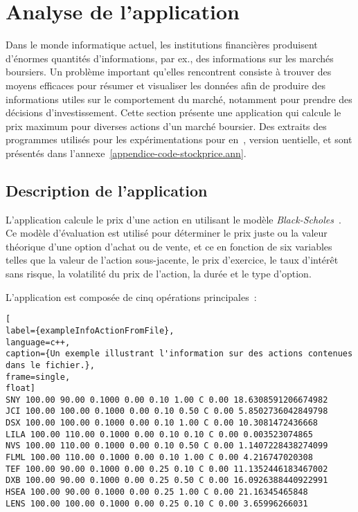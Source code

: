 \section{Analyse de l'application }
\label{stockprice.sect}

Dans le monde informatique actuel, les institutions financi\`eres produisent d'\'enormes quantit\'es d'informations, par ex., des informations sur les march\'es boursiers. Un probl\`eme important qu'elles rencontrent consiste \`a trouver des moyens efficaces pour r\'esumer et visualiser les donn\'ees afin de produire des informations utiles sur le comportement du march\'e, notamment pour prendre des d\'ecisions d'investissement. Cette section pr\'esente une application qui calcule le prix maximum pour diverses actions d'un marché boursier. Des extraits des programmes utilis\'es pour les exp\'erimentations pour  en~,  version uentielle,  et  sont pr\'esent\'es dans l'annexe~\ref{appendice-code-stockprice.ann}.


\subsection{Description de l'application}

L'application  calcule le prix d'une action en utilisant le modèle \emph{Black-Scholes}~\citep{macbeth1979empirical}. Ce mod\`ele d'\'evaluation est utilis\'e pour d\'eterminer le prix juste ou la valeur th\'eorique d'une option d'achat ou de vente, et ce en fonction de six variables telles que la valeur de l'action sous-jacente, le prix d'exercice, le taux d'int\'er\^et sans risque, la volatilit\'e du prix de l'action, la dur\'ee et le type d'option. 

L'application  est compos\'ee de cinq op\'erations principales~: 

\begin{lstlisting}[
label={exampleInfoActionFromFile},
language=c++,
caption={Un exemple illustrant l'information sur des actions contenues dans le fichier.},
frame=single,
float]
SNY 100.00 90.00 0.1000 0.00 0.10 1.00 C 0.00 18.6308591206674982
JCI 100.00 100.00 0.1000 0.00 0.10 0.50 C 0.00 5.8502736042849798
DSX 100.00 100.00 0.1000 0.00 0.10 1.00 C 0.00 10.3081472436668
LILA 100.00 110.00 0.1000 0.00 0.10 0.10 C 0.00 0.003523074865
NVS 100.00 110.00 0.1000 0.00 0.10 0.50 C 0.00 1.1407228438274099
FLML 100.00 110.00 0.1000 0.00 0.10 1.00 C 0.00 4.216747020308
TEF 100.00 90.00 0.1000 0.00 0.25 0.10 C 0.00 11.1352446183467002
DXB 100.00 90.00 0.1000 0.00 0.25 0.50 C 0.00 16.0926388440922991
HSEA 100.00 90.00 0.1000 0.00 0.25 1.00 C 0.00 21.16345465848
LENS 100.00 100.00 0.1000 0.00 0.25 0.10 C 0.00 3.65996266031
\end{lstlisting}

